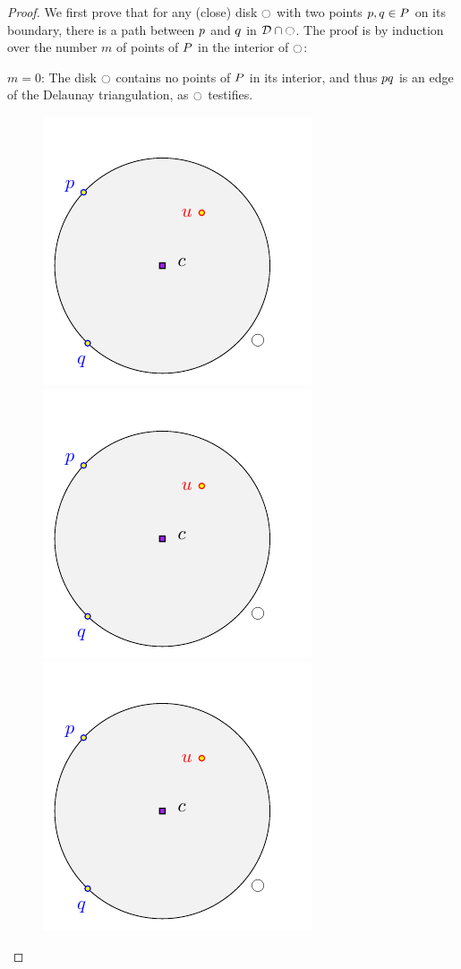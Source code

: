 \documentclass[12pt]{article}%
\begin{document}
\begin{proof}
    We first prove that for any (close) disk $\ocircle$ with two points
    $p,q\in P$ on its boundary, there is a path between $p$
    and $q$ in $\mathcal{D} \cap {\ocircle}$.  The proof is by induction
    over the number $m$ of points of $P$ in the interior of $\ocircle$:
    \begin{compactitem}
        \item{} $m=0$: The disk $\ocircle$ contains no points of $P$ in
        its interior, and thus $p q$ is an edge of the Delaunay
        triangulation, as $\ocircle$ testifies.

        \begin{figure}[h]
            \phantom{}\hfill%
            \includegraphics[page=1]{figs/shrink}%
            \hfill%
            \includegraphics[page=2]{figs/shrink}%
            \hfill%
            \includegraphics[page=3]{figs/shrink}%

\end{figure}
\end{compactitem}
\end{proof}
\end{document}

